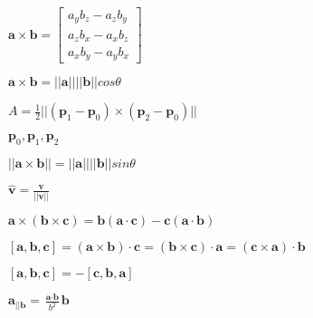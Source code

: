\documentclass{article}
\def\lthtmlcheckvsize{\ifdim\ht\sizebox<\vsize 
  \ifdim\wd\sizebox<\hsize\expandafter\hfill\fi \expandafter\vfill
  \else\expandafter\vss\fi}%
\begin{document}
{\newpage\clearpage
{}%
$ \textbf{a} \times \textbf{b} = \begin{bmatrix}
	a_y b_z - a_z b_y \\
	a_z b_x - a_x b_z \\
	a_x b_y - a_y b_x
	\end{bmatrix}
$%
\lthtmlindisplaymathZ
\lthtmlcheckvsize\clearpage}

{\newpage\clearpage
{}%
$ \textbf{a} \times \textbf{b} = ||\textbf{a}|| ||\textbf{b}|| cos \theta$%
\lthtmlindisplaymathZ
\lthtmlcheckvsize\clearpage}

{\newpage\clearpage
{}%
$ A = \frac{1}{2} ||(\textbf{p}_1 - \textbf{p}_0) \times (\textbf{p}_2 - \textbf{p}_0)|| $%
\lthtmlindisplaymathZ
\lthtmlcheckvsize\clearpage}

{\newpage\clearpage
{}%
$ \textbf{p}_0, \textbf{p}_1, \textbf{p}_2$%
\lthtmlindisplaymathZ
\lthtmlcheckvsize\clearpage}

{\newpage\clearpage
{}%
$ ||\textbf{a} \times \textbf{b}|| = ||\textbf{a}|| ||\textbf{b}|| sin\theta$%
\lthtmlindisplaymathZ
\lthtmlcheckvsize\clearpage}

{\newpage\clearpage
{}%
$ \hat{\textbf{v}} = \frac{\textbf{v}}{||\textbf{v}||} $%
\lthtmlindisplaymathZ
\lthtmlcheckvsize\clearpage}

{\newpage\clearpage
{}%
$ \textbf{a} \times (\textbf{b} \times \textbf{c}) = 
\textbf{b}(\textbf{a} \cdot \textbf{c}) - \textbf{c}(\textbf{a} \cdot \textbf{b})$%
\lthtmlindisplaymathZ
\lthtmlcheckvsize\clearpage}

{\newpage\clearpage
{}%
$ [ \textbf{a}, \textbf{b}, \textbf{c} ] 
= (\textbf{a} \times \textbf{b}) \cdot \textbf{c} = (\textbf{b} \times 
\textbf{c}) \cdot \textbf{a} 
= (\textbf{c} \times \textbf{a}) \cdot \textbf{b} $%
\lthtmlindisplaymathZ
\lthtmlcheckvsize\clearpage}

{\newpage\clearpage
{}%
$ [ \textbf{a}, \textbf{b}, \textbf{c} ] = -[ \textbf{c}, \textbf{b}, \textbf{a} ]$%
\lthtmlindisplaymathZ
\lthtmlcheckvsize\clearpage}

{\newpage\clearpage
{}%
$ \textbf{a}_{||\textbf{b}} = \frac{\textbf{a} \cdot \textbf{b}}{b^2} \textbf{b} $%
\lthtmlindisplaymathZ
\lthtmlcheckvsize\clearpage}
\end{document}
